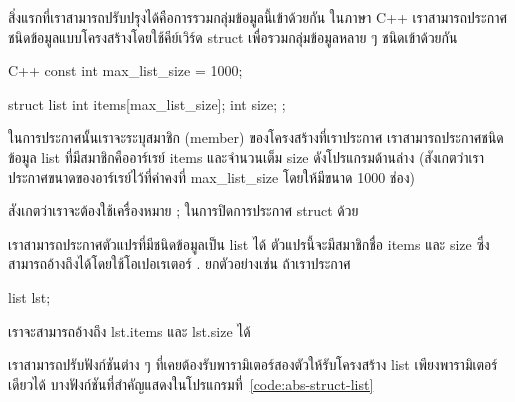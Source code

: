 สิ่ง{\wbr}แรก{\wbr}ที่{\wbr}เรา{\wbr}สามารถ{\wbr}ปรับปรุง{\wbr}ได้{\wbr}คือ{\wbr}การ{\wbr}รวม{\wbr}กลุ่ม{\wbr}ข้อมูล{\wbr}นี้{\wbr}เข้า{\wbr}ด้วย{\wbr}กัน ใน{\wbr}ภาษา C++
เรา{\wbr}สามารถ{\wbr}ประกาศ{\wbr}ชนิด{\wbr}ข้อมูล{\wbr}แบบ{\wbr}โครงสร้าง{\wbr}โดย{\wbr}ใช้{\wbr}คีย์{\wbr}เวิร์ด {\ct struct}
เพื่อ{\wbr}รวม{\wbr}กลุ่ม{\wbr}ข้อมูล{\wbr}หลาย ๆ ชนิด{\wbr}เข้า{\wbr}ด้วย{\wbr}กัน{\wbr}

\latintext
\begin{codelist}{C++}{}
const int max_list_size = 1000;

struct list {
  int items[max_list_size];
  int size;
};
\end{codelist}
\thaitext

ใน{\wbr}การ{\wbr}ประกาศ{\wbr}นั้น{\wbr}เรา{\wbr}จะ{\wbr}ระบุ{\wbr}สมาชิก (member) ของ{\wbr}โครงสร้าง{\wbr}ที่{\wbr}เรา{\wbr}ประกาศ{\wbr}
เรา{\wbr}สามารถ{\wbr}ประกาศ{\wbr}ชนิด{\wbr}ข้อมูล {\ct list} ที่{\wbr}มี{\wbr}สมาชิก{\wbr}คือ{\wbr}อาร์เรย์ {\ct items}
และ{\wbr}จำนวนเต็ม {\ct size} ดัง{\wbr}โปรแกรม{\wbr}ด้าน{\wbr}ล่าง{\wbr}
(สังเกต{\wbr}ว่า{\wbr}เรา{\wbr}ประกาศ{\wbr}ขนาด{\wbr}ของ{\wbr}อาร์เรย์{\wbr}ไว้{\wbr}ที่{\wbr}ค่าคงที่ {\ct max\_list\_size}
โดย{\wbr}ให้{\wbr}มี{\wbr}ขนาด 1000 ช่อง)

สังเกต{\wbr}ว่า{\wbr}เรา{\wbr}จะ{\wbr}ต้อง{\wbr}ใช้{\wbr}เครื่องหมาย {\ct ;} ใน{\wbr}การ{\wbr}ปิด{\wbr}การ{\wbr}ประกาศ {\ct struct} ด้วย{\wbr}

เรา{\wbr}สามารถ{\wbr}ประกาศ{\wbr}ตัวแปร{\wbr}ที่{\wbr}มี{\wbr}ชนิด{\wbr}ข้อมูล{\wbr}เป็น {\ct list} ได้ ตัวแปร{\wbr}นี้{\wbr}จะ{\wbr}มี{\wbr}สมาชิก{\wbr}ชื่อ {\ct
  items} และ {\ct size} ซึ่ง{\wbr}สามารถ{\wbr}อ้าง{\wbr}ถึง{\wbr}ได้{\wbr}โดย{\wbr}ใช้{\wbr}โอ{\wbr}เปอเรเตอร์ {\ct .}
ยก{\wbr}ตัวอย่าง{\wbr}เช่น ถ้า{\wbr}เรา{\wbr}ประกาศ{\wbr}
\begin{center}
{\ct list lst;}
\end{center}
เรา{\wbr}จะ{\wbr}สามารถ{\wbr}อ้าง{\wbr}ถึง {\ct lst.items} และ {\ct lst.size} ได้{\wbr}

เรา{\wbr}สามารถ{\wbr}ปรับ{\wbr}ฟังก์ชัน{\wbr}ต่าง ๆ ที่{\wbr}เคย{\wbr}ต้อง{\wbr}รับ{\wbr}พารามิเตอร์{\wbr}สอง{\wbr}ตัว{\wbr}ให้{\wbr}รับ{\wbr}โครงสร้าง {\ct list}
เพียง{\wbr}พารามิเตอร์{\wbr}เดียว{\wbr}ได้ บาง{\wbr}ฟังก์ชัน{\wbr}ที่{\wbr}สำคัญ{\wbr}แสดง{\wbr}ใน{\wbr}โปรแกรม{\wbr}ที่~\ref{code:abs-struct-list}

